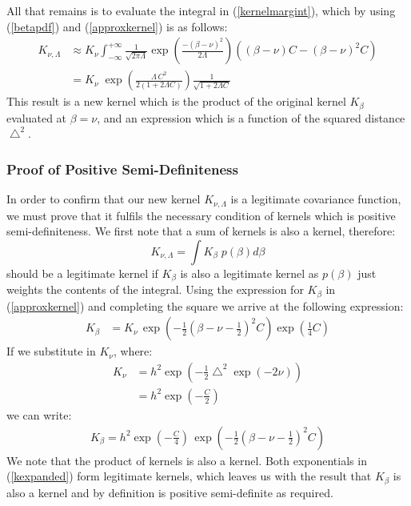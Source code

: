 \documentclass{article}
\begin{document}
All that remains is to evaluate the integral in (\ref{kernelmargint}), which by using (\ref{betapdf}) and (\ref{approxkernel}) is as follows:
\begin{align}
K_{\nu,\Lambda} &\approx K_{\nu}\int_{-\infty}^{+\infty} \frac{1}{\sqrt{2 \pi \Lambda}} \exp \left( \frac{ -(\beta - \nu)^2}{2\Lambda} \right) \left( (\beta-\nu) C - (\beta-\nu)^2 C \right) \nonumber \\
&= K_{\nu} \; \exp \left( \frac{\Lambda\, C^2}{2(1+2\Lambda C)} \right) \frac{1}{\sqrt{1+ 2\Lambda C}}
\end{align}
This result is a new kernel which is the product of the original kernel $K_\beta$ evaluated at $\beta=\nu$, and an expression which is a function of the squared distance $ \bigtriangleup^2$. 



\subsubsection{Proof of Positive Semi-Definiteness}

In order to confirm that our new kernel $K_{\nu,\Lambda}$ is a legitimate covariance function, we must prove that it fulfils the necessary condition of kernels which is positive semi-definiteness. We first note that a sum of kernels is also a kernel, therefore:
\begin{equation}
K_{\nu,\Lambda} = \int K_\beta \;p(\beta)d\beta
\end{equation}
should be a legitimate kernel if $K_\beta$ is also a legitimate kernel as $p(\beta)$ just weights the contents of the integral. Using the expression for $K_\beta$ in (\ref{approxkernel}) and completing the square we arrive at the following expression:
\begin{align}
K_\beta &= K_{\nu} \,  \exp \left(  -\frac{1}{2} \left( \beta - \nu - \frac{1}{2} \right) ^ 2C   \right) \exp \left( \frac{1}{4}C \right)
\end{align}
If we substitute in $K_\nu$, where:
\begin{align}
K_{\nu} &= h^2 \exp\left( -\frac{1}{2}\bigtriangleup^2 \exp(-2\nu) \right) \nonumber\\
&= h^2 \exp\left( -\frac{C}{2} \right)
\end{align}
we can write:
\begin{align}
K_{\beta} = h^2  \exp\left( -\frac{C}{4} \right) \,  \exp \left(  -\frac{1}{2} \left( \beta - \nu - \frac{1}{2} \right) ^ 2C   \right) \label{kexpanded}
\end{align}
We note that the product of kernels is also a kernel. Both exponentials in (\ref{kexpanded}) form legitimate kernels, which leaves us with the result that $K_\beta$ is also a kernel and by definition is positive semi-definite as required.
\end{document}

